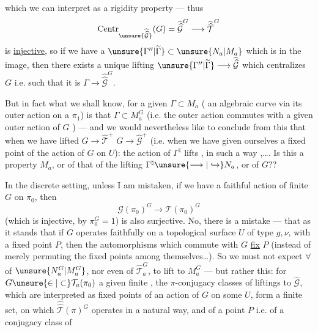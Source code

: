 
which we can  interpret as a rigidity property --- thus
\[
\operatorname{Centr}_{\unsure{\widehat{\widehat{\mathcal G}}}}(G)
=\widehat{\widehat{\mathcal G}}^{G}
\longrightarrow\widehat{\widehat{\mathcal T}}^{G}
\]
is \uline{injective}, so if we have a $\unsure{\Gamma''|\widetilde{\Gamma}}\subset\unsure{N_a|M_a}$ which is in the image, then there exists a unique lifting $\unsure{\Gamma''|\widetilde{\Gamma}}\longrightarrow\widehat{\widehat{\mathcal G}}$ which centralizes $G$ i.e. such that it is $\Gamma\longrightarrow\widehat{\widehat{\mathcal G}}^{G}$.

But in fact what we shall know, for a given $\Gamma\subset M_a$ ( an algebraic curve via its outer action on a $\pi_1$) is that $\Gamma\subset M_a^G$ (i.e. the outer action commutes with a given outer action of $G$ ) --- and we would nevertheless like to conclude from this that when we have lifted $G\longrightarrow\widehat{\mathcal T}^{+}$  $G\longrightarrow\widehat{\mathcal G}^{+}$ (i.e. when we have given ourselves a fixed point of the action of $G$ on $U$):  the action of $\Gamma^{\natural}$ lifts  ,  in such a way  ,\ldots . Is this a property  $M_a$, or of that of the lifting $\Gamma^{\natural}\unsure{\longrightarrow|\hookrightarrow}N_a$, or of $G$??


In the discrete setting, unless I am mistaken, if we have a faithful action  of finite $G$ on $\pi_0$, then 
\[
\mathcal G(\pi_0)^G\longrightarrow\mathcal T(\pi_0)^G
\]
(which is injective, by $\pi_0^G=1$) is also surjective. No, there is a mistake --- that  as it stands that if $G$ operates faithfully on a topological surface $U$ of type $g,\nu$, with a fixed point $P$, then the automorphisms which commute with $G$ \uline{fix} $P$ (instead of merely permuting the fixed points among themselves\ldots). So we must not expect $\forall$  of $\unsure{N_a^G|M_a^G}$, nor even of $\widehat{\mathcal T}_a^G$, to lift to $M_a^G$ --- but rather this: for $G\unsure{\in|\subset}\mathcal T_a(\pi_0)$ a given finite , the $\pi$-conjugacy classes of liftings to $\widehat{\mathcal G}$,  which are interpreted as fixed points of an action of $G$ on some $U$, form a finite set, on which $\widehat{\widehat{\mathcal T}}(\pi)^G$ operates in a natural way, and   of a point $P$ i.e. of a conjugacy class of 